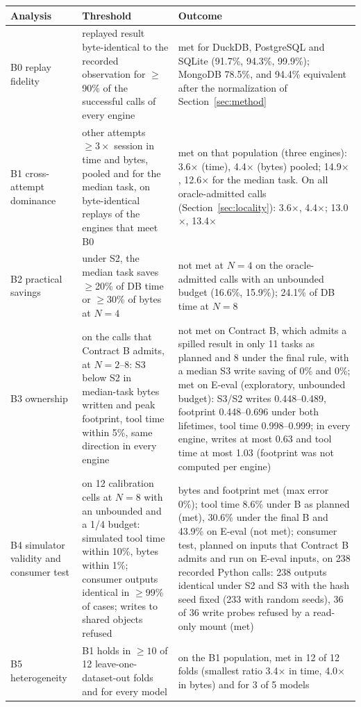 \begin{tabular}{@{}L{3.3cm}L{6.1cm}L{6.7cm}@{}}
\toprule
Analysis & Threshold & Outcome \\
\midrule
B0 replay fidelity & replayed result byte-identical to the recorded observation for $\geq$90\% of the successful calls of every engine & met for DuckDB, PostgreSQL and SQLite (91.7\%, 94.3\%, 99.9\%); MongoDB 78.5\%, and 94.4\% equivalent after the normalization of Section~\ref{sec:method} \\
B1 cross-attempt dominance & other attempts $\geq 3\times$ session in time and bytes, pooled and for the median task, on byte-identical replays of the engines that meet B0 & met on that population (three engines): 3.6$\times$ (time), 4.4$\times$ (bytes) pooled; 14.9$\times$, 12.6$\times$ for the median task. On all oracle-admitted calls (Section~\ref{sec:locality}): 3.6$\times$, 4.4$\times$; 13.0$\times$, 13.4$\times$ \\
B2 practical savings & under S2, the median task saves $\geq$20\% of DB time or $\geq$30\% of bytes at $N=4$ & not met at $N=4$ on the oracle-admitted calls with an unbounded budget (16.6\%, 15.9\%); 24.1\% of DB time at $N=8$ \\
B3 ownership & on the calls that Contract B admits, at $N=2$--8: S3 below S2 in median-task bytes written and peak footprint, tool time within 5\%, same direction in every engine & not met on Contract B, which admits a spilled result in only 11 tasks as planned and 8 under the final rule, with a median S3 write saving of 0\% and 0\%; met on E-eval (exploratory, unbounded budget): S3/S2 writes 0.448--0.489, footprint 0.448--0.696 under both lifetimes, tool time 0.998--0.999; in every engine, writes at most 0.63 and tool time at most 1.03 (footprint was not computed per engine) \\
B4 simulator validity and consumer test & on 12 calibration cells at $N=8$ with an unbounded and a 1/4 budget: simulated tool time within 10\%, bytes within 1\%; consumer outputs identical in $\geq$99\% of cases; writes to shared objects refused & bytes and footprint met (max error 0\%); tool time 8.6\% under B as planned (met), 30.6\% under the final B and 43.9\% on E-eval (not met); consumer test, planned on inputs that Contract B admits and run on E-eval inputs, on 238 recorded Python calls: 238 outputs identical under S2 and S3 with the hash seed fixed (233 with random seeds), 36 of 36 write probes refused by a read-only mount (met) \\
B5 heterogeneity & B1 holds in $\geq 10$ of 12 leave-one-dataset-out folds and for every model & on the B1 population, met in 12 of 12 folds (smallest ratio 3.4$\times$ in time, 4.0$\times$ in bytes) and for 3 of 5 models \\
\bottomrule
\end{tabular}
